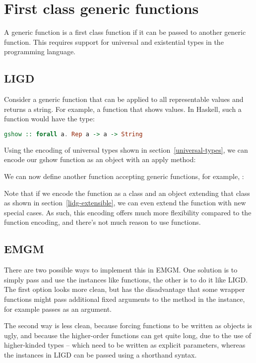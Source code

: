 \section{First class generic functions}

A generic function is a first class function if it can be passed to another
generic function. This requires support for universal and existential types in the programming
language.

\subsection{LIGD}

Consider a generic function that can be applied to all representable values
and returns a string. For example, a function  that shows values.
In Haskell, such a function would have the type:
\begin{lstlisting}[language=Haskell]
gshow :: forall a. Rep a -> a -> String
\end{lstlisting}

Using the encoding of universal types shown in section~\ref{universal-types},
we can encode our gshow function as an object with an apply method:

We can now define another function accepting generic functions, for example, :


Note that if we encode the function as a class and an object extending that
class as shown in section~\ref{lidg-extensible}, we can even extend the
function with new special cases. As such, this encoding offers much more
flexibility compared to the function encoding, and there's not much reason
to use functions.

\subsection{EMGM}
There are two possible ways to implement this in EMGM. One solution is to
simply pass and use the  instances like functions, the other is to do it
like LIGD. The first option looks more clean, but has the disadvantage that
some wrapper functions might pass additional fixed arguments to the method
in the  instance,  for example passes  as
an argument.

The second way is less clean, because forcing functions to be written as objects
is ugly, and because the higher-order functions can get quite long, due to the
use of higher-kinded types -- which need to be written as explicit parameters,
whereas the  instances in LIGD can be passed using a shorthand syntax.

